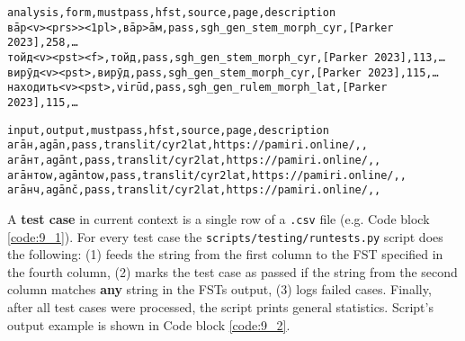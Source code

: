 \begin{code_frame}[float,floatplacement=!htbp]
    \begin{subbox}[title={A fragment of \texttt{scripts/testing/tests/verb.csv}},
                   width=15.5cm,height=3.5cm]
        \begin{footnotesize}
        \begin{verbatim}
analysis,form,mustpass,hfst,source,page,description
вāр<v><prs>><1pl>,вāр>āм,pass,sgh_gen_stem_morph_cyr,[Parker 2023],258,…
тойд<v><pst><f>,тойд,pass,sgh_gen_stem_morph_cyr,[Parker 2023],113,…
вирӯд<v><pst>,вирӯд,pass,sgh_gen_stem_morph_cyr,[Parker 2023],115,…
находить<v><pst>,virūd,pass,sgh_gen_rulem_morph_lat,[Parker 2023],115,…
        \end{verbatim}
        \end{footnotesize}
    \end{subbox}
    \begin{subbox}[title={A fragment of \texttt{scripts/testing/tests/translit.csv}},
                   width=15.5cm,height=3.5cm]
        \begin{footnotesize}
        \begin{verbatim}
input,output,mustpass,hfst,source,page,description
агāн,agān,pass,translit/cyr2lat,https://pamiri.online/,,
агāнт,agānt,pass,translit/cyr2lat,https://pamiri.online/,,
агāнтоw,agāntow,pass,translit/cyr2lat,https://pamiri.online/,,
агāнч,agānč,pass,translit/cyr2lat,https://pamiri.online/,,
        \end{verbatim}
        \end{footnotesize}
    \end{subbox}
    \tcblower
    \label{code:9_1}
\end{code_frame}

A \textbf{test case} in current context is a single row of a \texttt{.csv} file (e.g. Code block \ref{code:9_1}). For every test case the \texttt{scripts/testing/runtests.py} script does the following: (1) feeds the string from the first column to the FST specified in the fourth column, (2) marks the test case as passed if the string from the second column matches \textbf{any} string in the FSTs output, (3) logs failed cases. Finally, after all test cases were processed, the script prints general statistics. Script's output example is shown in Code block \ref{code:9_2}.

